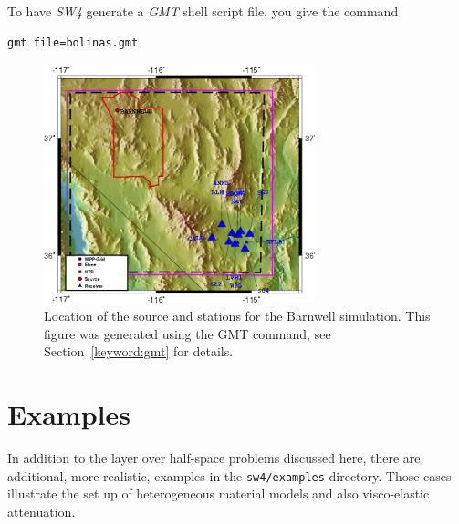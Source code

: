 \documentclass[11pt]{report}
\begin{document}
To have \emph{SW4} generate a \emph{GMT} shell script file, you give the command
\begin{verbatim}
gmt file=bolinas.gmt
\end{verbatim}
%
\begin{figure}
\begin{center}
\includegraphics[width=0.7\textwidth]{figures/topography-gmt-small.png} 
\caption{Location of the source and stations for the Barnwell simulation. This figure was
  generated using the GMT command, see Section~\protect\ref{keyword:gmt} for details.}
\label{fig:topography-gmt}
\end{center}
\end{figure}
%

\chapter{Examples} \label{sec:examples}

In addition to the layer over half-space problems discussed here, there are additional, more
realistic, examples in the \verb+sw4/examples+ directory. Those cases illustrate the set up of
heterogeneous material models and also visco-elastic attenuation.
\end{document}

